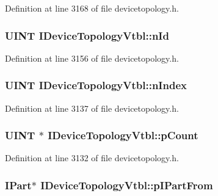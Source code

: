 Definition at line 3168 of file devicetopology.\+h.

\subsubsection[{\texorpdfstring{n\+Id}{nId}}]{ {\bf U\+I\+NT} I\+Device\+Topology\+Vtbl\+::n\+Id}\hypertarget{struct_i_device_topology_vtbl_a5b5c8129f0339326140197b66c0311db}{}\label{struct_i_device_topology_vtbl_a5b5c8129f0339326140197b66c0311db}


Definition at line 3156 of file devicetopology.\+h.

\subsubsection[{\texorpdfstring{n\+Index}{nIndex}}]{ {\bf U\+I\+NT} I\+Device\+Topology\+Vtbl\+::n\+Index}\hypertarget{struct_i_device_topology_vtbl_aa32c6d96f822d89c8b4e5ebd397af956}{}\label{struct_i_device_topology_vtbl_aa32c6d96f822d89c8b4e5ebd397af956}


Definition at line 3137 of file devicetopology.\+h.

\subsubsection[{\texorpdfstring{p\+Count}{pCount}}]{ {\bf U\+I\+NT} $\ast$ I\+Device\+Topology\+Vtbl\+::p\+Count}\hypertarget{struct_i_device_topology_vtbl_a408195f7b0d2c91aaa32fff15f37d850}{}\label{struct_i_device_topology_vtbl_a408195f7b0d2c91aaa32fff15f37d850}


Definition at line 3132 of file devicetopology.\+h.

\subsubsection[{\texorpdfstring{p\+I\+Part\+From}{pIPartFrom}}]{ {\bf I\+Part}$\ast$ I\+Device\+Topology\+Vtbl\+::p\+I\+Part\+From}\hypertarget{struct_i_device_topology_vtbl_a8dbe6e2e90e01c9c5b6dc864d068d8d3}{}\label{struct_i_device_topology_vtbl_a8dbe6e2e90e01c9c5b6dc864d068d8d3}


